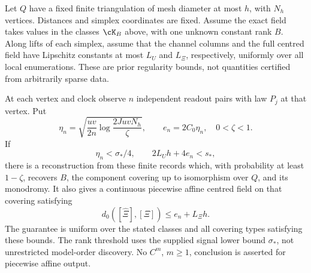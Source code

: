 \begin{theorem}
\label{thm:v84-mesh}
Let $Q$ have a fixed finite triangulation of mesh diameter at most $h$,
with $N_h$ vertices. Distances and simplex coordinates are fixed.
Assume the exact field takes values in the classes $\cK_B$ above,
with one unknown constant rank $B$. Along lifts of each simplex, assume
that the channel columns and the full centred field have Lipschitz
constants at most $L_U$ and $L_\Xi$, respectively, uniformly over
all local enumerations. These are prior regularity bounds, not
quantities certified from arbitrarily sparse data.

At each vertex and clock observe $n$ independent readout pairs with
law $P_j$ at that vertex. Put
\[
 \eta_n=\sqrt{\frac{uv}{2n}
           \log\frac{2JuvN_h}{\zeta}},\qquad e_n=2C_0\eta_n,
                    \quad 0<\zeta<1.
\]
If
\begin{equation}\label{eq:v84-mesh-margins}
 \eta_n<\sigma_*/4,\qquad 2L_Uh+4e_n<s_* ,
\end{equation}
there is a reconstruction from these finite records which, with
probability at least $1-\zeta$, recovers $B$, the component covering
up to isomorphism over $Q$, and its monodromy. It also gives a
continuous piecewise affine centred field on that covering satisfying
\begin{equation}\label{eq:v84-mesh-error}
 d_0([\widehat\Xi],[\Xi])\le e_n+L_\Xi h.
\end{equation}
The guarantee is uniform over the stated classes and all covering
types satisfying these bounds. The rank threshold uses the supplied
signal lower bound $\sigma_*$, not unrestricted model-order discovery.
No $C^m$, $m\ge1$, conclusion is asserted for piecewise affine output.
\end{theorem}
